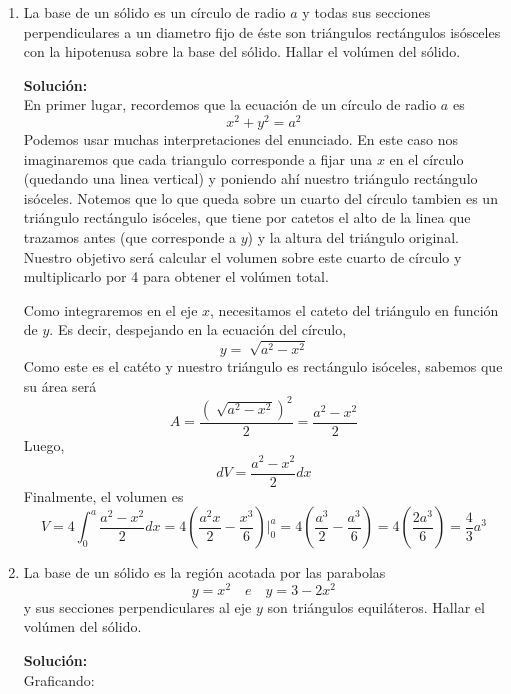 \documentclass[12pt]{article}
\newenvironment{solucion}
{\begin{mdframed}[backgroundcolor=black!10]
		{\bf Solución:}\\
	}
	{
	\end{mdframed}
}
\newenvironment{preguntas}
{\begin{enumerate}\itemsep12pt
	}
	{
	\end{enumerate}
}
\newcommand{\ev}{\Big|}
\begin{document}
\begin{preguntas}
\begin{solucion}
		Luego, el área de cada sección será
		$$A = \pi \dfrac{1}{x}$$
		Asi, el volumen de cada sección será
		$$dV = \pi \dfrac{1}{x} dx$$
		Finalmente, el volumen que buscamos corresponde a integrar en el dominio, es decir
		$$V = \displaystyle \int_1^e \pi \dfrac{1}{x} dx = \pi ln(x) \ev_1^e = \pi - 0 = \pi$$
\end{solucion}
\item La base de un sólido es un círculo de radio $a$ y todas sus secciones perpendiculares a un diametro fijo de éste son triángulos rectángulos isósceles con la hipotenusa sobre la base del sólido. Hallar el volúmen del sólido.
\begin{solucion}
En primer lugar, recordemos que la ecuación de un círculo de radio $a$ es
		$$x^2 + y^2 = a^2$$
		Podemos usar muchas interpretaciones del enunciado. En este caso nos imaginaremos que cada triangulo corresponde a fijar una $x$ en el círculo (quedando una linea vertical) y poniendo ahí nuestro triángulo rectángulo isóceles. Notemos que lo que queda sobre un cuarto del círculo tambien es un triángulo rectángulo isóceles, que tiene por catetos el alto de la linea que trazamos antes (que corresponde a $y$) y la altura del triángulo original. Nuestro objetivo será calcular el volumen sobre este cuarto de círculo y multiplicarlo por 4 para obtener el volúmen total.
		
		Como integraremos en el eje $x$, necesitamos el cateto del triángulo en función de $y$. Es decir, despejando en la ecuación del círculo,
		$$y = \sqrt[]{a^2-x^2}$$
		Como este es el catéto y nuestro triángulo es rectángulo isóceles, sabemos que su área será
		$$A =  \dfrac{(\sqrt[]{a^2-x^2})^2}{2} = \dfrac{a^2-x^2}{2}$$
		Luego,
		$$dV = \dfrac{a^2-x^2}{2} dx$$
		Finalmente, el volumen es
		$$V = 4 \displaystyle \int_0^a \dfrac{a^2-x^2}{2} dx = 4\left(\dfrac{a^2x}{2} - \dfrac{x^3}{6}\right) \ev_0^a = 4\left(\dfrac{a^3}{2} - \dfrac{a^3}{6}\right) = 4\left(\dfrac{2a^3}{6}\right) = \dfrac{4}{3}a^3$$
\end{solucion}
\item La base de un sólido es la región acotada por las parabolas
	$$y=x^2 \quad e \quad y = 3-2x^2$$
	y sus secciones perpendiculares al eje $y$ son triángulos equiláteros. Hallar el volúmen del sólido.
\begin{solucion}
Graficando:
		\begin{center}
\end{center}
\end{solucion}
\end{preguntas}
\end{document}
